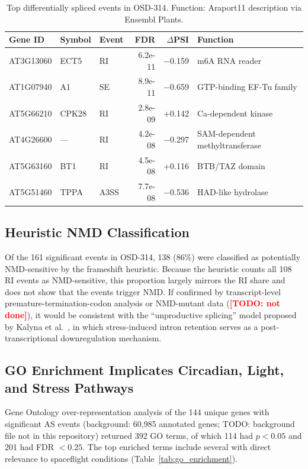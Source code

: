 \documentclass[12pt,a4paper]{article}
\newcommand{\TODO}[1]{\textcolor{red}{\textbf{[TODO: #1]}}}
\begin{document}
\begin{table}[h]
\centering
\caption{Top differentially spliced events in OSD-314. Function: Araport11 description via Ensembl Plants.}
\label{tab:top_genes}
\small
\begin{tabular}{lllrrl}
\toprule
\textbf{Gene ID} & \textbf{Symbol} & \textbf{Event} & \textbf{FDR} & \textbf{$\Delta$PSI} & \textbf{Function} \\
\midrule
AT3G13060 & ECT5 & RI & 6.2e-11 & $-$0.159 & m6A RNA reader \\
AT1G07940 & A1 & SE & 8.9e-11 & $-$0.659 & GTP-binding EF-Tu family \\
AT5G66210 & CPK28 & RI & 2.8e-09 & +0.142 & Ca-dependent kinase \\
AT4G26600 & --- & RI & 4.2e-08 & $-$0.297 & SAM-dependent methyltransferase \\
AT5G63160 & BT1 & RI & 4.5e-08 & +0.116 & BTB/TAZ domain \\
AT5G51460 & TPPA & A3SS & 7.7e-08 & $-$0.536 & HAD-like hydrolase \\
\bottomrule
\end{tabular}
\end{table}

\subsection{Heuristic NMD Classification}

Of the 161 significant events in OSD-314, 138 (86\%) were classified as potentially NMD-sensitive by the frameshift heuristic. Because the heuristic counts all 108 RI events as NMD-sensitive, this proportion largely mirrors the RI share and does not show that the events trigger NMD. If confirmed by transcript-level premature-termination-codon analysis or NMD-mutant data (\TODO{not done}), it would be consistent with the ``unproductive splicing'' model proposed by Kalyna et al.~\cite{kalyna2012}, in which stress-induced intron retention serves as a post-transcriptional downregulation mechanism.

\subsection{GO Enrichment Implicates Circadian, Light, and Stress Pathways}

Gene Ontology over-representation analysis of the 144 unique genes with significant AS events (background: 60,985 annotated genes; TODO: background file not in this repository) returned 392 GO terms, of which 114 had $p < 0.05$ and 201 had FDR $< 0.25$. The top enriched terms include several with direct relevance to spaceflight conditions (Table~\ref{tab:go_enrichment}).
\end{document}
